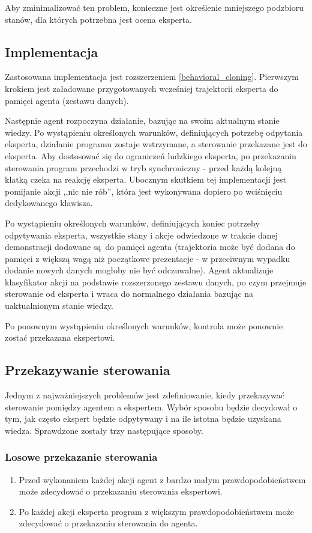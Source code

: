 \documentclass[polish,master,a4paper,oneside]{ppfcmthesis}
\begin{document}
Aby zminimalizować ten problem, konieczne jest określenie mniejszego podzbioru stanów, dla których potrzebna jest ocena eksperta.


\subsection{Implementacja} 
Zastosowana implementacja jest rozszerzeniem \ref{behavioral_cloning}. Pierwszym krokiem jest załadowane przygotowanych wcześniej trajektorii eksperta do pamięci agenta (zestawu danych).

Następnie agent rozpoczyna działanie, bazując na swoim aktualnym stanie wiedzy. Po wystąpieniu określonych warunków, definiujących potrzebę odpytania eksperta, działanie programu zostaje wstrzymane, a sterowanie przekazane jest do eksperta. Aby dostosować się do ograniczeń ludzkiego eksperta, po przekazaniu sterowania program przechodzi w tryb synchroniczny - przed każdą kolejną klatką czeka na reakcję eksperta. Ubocznym skutkiem tej implementacji jest pomijanie akcji ,,nic nie rób'', która jest wykonywana dopiero po wciśnięciu dedykowanego klawisza.

Po wystąpieniu określonych warunków, definiujących koniec potrzeby odpytywania eksperta, wszystkie stany i akcje odwiedzone w trakcie danej demonstracji dodawane są do pamięci agenta (trajektoria może być dodana do pamięci z większą wagą niż początkowe prezentacje - w przeciwnym wypadku dodanie nowych danych mogłoby nie być odczuwalne). Agent aktualizuje klasyfikator akcji na podstawie rozszerzonego zestawu danych, po czym przejmuje sterowanie od eksperta i wraca do normalnego działania bazując na uaktualnionym stanie wiedzy.

Po ponownym wystąpieniu określonych warunków, kontrola może ponownie zostać przekazana ekspertowi.

\subsection{Przekazywanie sterowania}
Jednym z najważniejszych problemów jest zdefiniowanie, kiedy przekazywać sterowanie pomiędzy agentem a ekspertem. Wybór sposobu będzie decydował o tym, jak często ekspert będzie odpytywany i na ile istotna będzie uzyskana wiedza. Sprawdzone zostały trzy następujące sposoby.

\subsubsection{Losowe przekazanie sterowania}
\begin{enumerate}
\item Przed wykonaniem każdej akcji agent z bardzo małym prawdopodobieństwem może zdecydować o przekazaniu sterowania ekspertowi.
\item Po każdej akcji eksperta program z większym prawdopodobieństwem może zdecydować o przekazaniu sterowania do agenta.
\end{enumerate}
\end{document}
